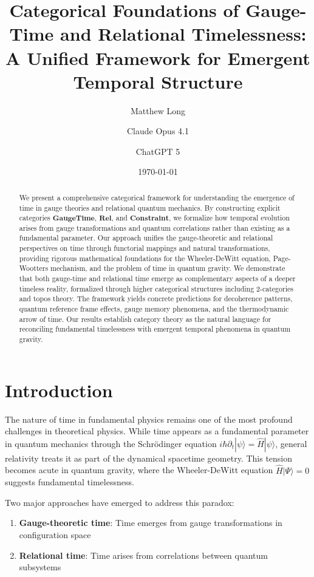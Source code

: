 \documentclass[12pt,a4paper]{article}
\title{Categorical Foundations of Gauge-Time and Relational Timelessness: A Unified Framework for Emergent Temporal Structure}
\author[1]{Matthew Long}
\author[2]{Claude Opus 4.1}
\author[3]{ChatGPT 5}
\affil[1]{YonedaAI}
\affil[2]{Anthropic}
\affil[3]{OpenAI}
\date{\today}
\begin{document}
\maketitle

\begin{abstract}
We present a comprehensive categorical framework for understanding the emergence of time in gauge theories and relational quantum mechanics. By constructing explicit categories $\mathbf{GaugeTime}$, $\mathbf{Rel}$, and $\mathbf{Constraint}$, we formalize how temporal evolution arises from gauge transformations and quantum correlations rather than existing as a fundamental parameter. Our approach unifies the gauge-theoretic and relational perspectives on time through functorial mappings and natural transformations, providing rigorous mathematical foundations for the Wheeler-DeWitt equation, Page-Wootters mechanism, and the problem of time in quantum gravity. We demonstrate that both gauge-time and relational time emerge as complementary aspects of a deeper timeless reality, formalized through higher categorical structures including 2-categories and topos theory. The framework yields concrete predictions for decoherence patterns, quantum reference frame effects, gauge memory phenomena, and the thermodynamic arrow of time. Our results establish category theory as the natural language for reconciling fundamental timelessness with emergent temporal phenomena in quantum gravity.
\end{abstract}

\section{Introduction}

The nature of time in fundamental physics remains one of the most profound challenges in theoretical physics. While time appears as a fundamental parameter in quantum mechanics through the Schrödinger equation $i\hbar\partial_t|\psi\rangle = \hat{H}|\psi\rangle$, general relativity treats it as part of the dynamical spacetime geometry. This tension becomes acute in quantum gravity, where the Wheeler-DeWitt equation $\hat{H}|\Psi\rangle = 0$ suggests fundamental timelessness.

Two major approaches have emerged to address this paradox:
\begin{enumerate}
\item \textbf{Gauge-theoretic time}: Time emerges from gauge transformations in configuration space
\item \textbf{Relational time}: Time arises from correlations between quantum subsystems
\end{enumerate}
\end{document}
